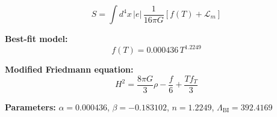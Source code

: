 
\begin{equation}
  S = \int d^4x \, |e| \, \frac{1}{16\pi G} \left[ f(T) + \mathcal{L}_m \right]
\end{equation}

\textbf{Best-fit model:}
\begin{equation}
  f(T) = 0.000436 \, T^{1.2249}
\end{equation}

\textbf{Modified Friedmann equation:}
\begin{equation}
  H^2 = \frac{8\pi G}{3} \rho - \frac{f}{6} + \frac{T f_T}{3}
\end{equation}

\textbf{Parameters:}
$\alpha = 0.000436$, \quad
$\beta = -0.183102$, \quad
$n = 1.2249$, \quad
$\Lambda_{\text{BI}} = 392.4169$